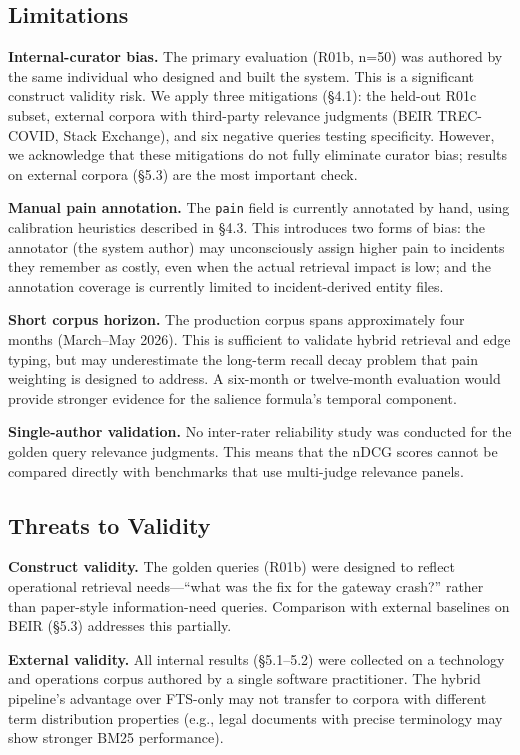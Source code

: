 \documentclass{article}
\begin{document}
\subsection{Limitations}

\textbf{Internal-curator bias.} The primary evaluation (R01b, n=50) was authored by the
same individual who designed and built the system. This is a significant construct validity
risk. We apply three mitigations (\S4.1): the held-out R01c subset, external corpora with
third-party relevance judgments (BEIR TREC-COVID, Stack Exchange), and six negative queries
testing specificity. However, we acknowledge that these mitigations do not fully eliminate
curator bias; results on external corpora (\S5.3) are the most important check.

\textbf{Manual pain annotation.} The \texttt{pain} field is currently annotated by hand,
using calibration heuristics described in \S4.3. This introduces two forms of bias: the
annotator (the system author) may unconsciously assign higher pain to incidents they
remember as costly, even when the actual retrieval impact is low; and the annotation
coverage is currently limited to incident-derived entity files.

\textbf{Short corpus horizon.} The production corpus spans approximately four months
(March--May 2026). This is sufficient to validate hybrid retrieval and edge typing, but
may underestimate the long-term recall decay problem that pain weighting is designed to
address. A six-month or twelve-month evaluation would provide stronger evidence for the
salience formula's temporal component.

\textbf{Single-author validation.} No inter-rater reliability study was conducted for the
golden query relevance judgments. This means that the nDCG scores cannot be compared
directly with benchmarks that use multi-judge relevance panels.

\subsection{Threats to Validity}

\textbf{Construct validity.} The golden queries (R01b) were designed to reflect
operational retrieval needs---``what was the fix for the gateway crash?'' rather than
paper-style information-need queries. Comparison with external baselines on BEIR (\S5.3)
addresses this partially.

\textbf{External validity.} All internal results (\S5.1--5.2) were collected on a
technology and operations corpus authored by a single software practitioner. The hybrid
pipeline's advantage over FTS-only may not transfer to corpora with different term
distribution properties (e.g., legal documents with precise terminology may show stronger
BM25 performance).
\end{document}
